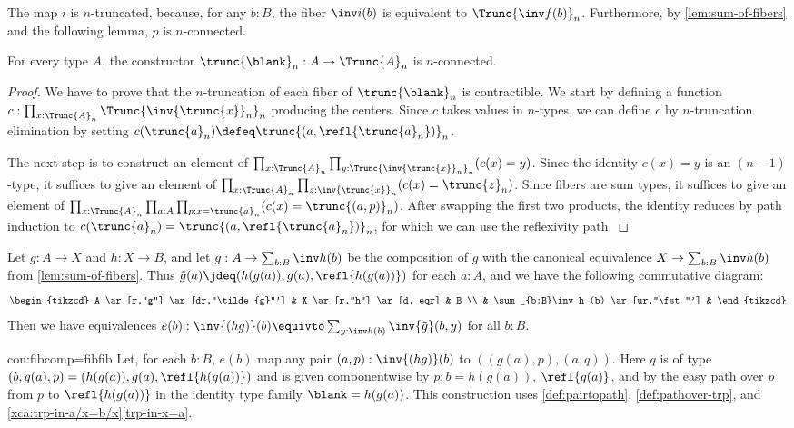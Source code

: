 The map $i$ is $n$-truncated, because, for any $b:B$, the fiber $\inv i (b)$ is equivalent to $\Trunc{\inv f (b)}_n$.
Furthermore, by \cref{lem:sum-of-fibers} and the following lemma, $p$ is $n$-connected.

\begin{lemma}\label{lem:trunc-n-connected}
For every type $A$, the constructor $\trunc{\blank}_n : A\to \Trunc{A}_n$
is $n$-connected.
\end{lemma}
\begin{proof}
We have to prove that the $n$-truncation of each fiber of $\trunc{\blank}_n$
is contractible. We start by defining a function
$c:\prod_{x:\Trunc{A}_n} \Trunc{\inv{\trunc{x}}_n}_n$ producing the centers.
Since $c$ takes values in $n$-types, we can define $c$ by
$n$-truncation elimination by setting
$c(\trunc{a}_n) \defeq \trunc{(a,\refl{\trunc{a}_n})}_n$.

The next step is to construct an element of
$\prod_{x:\Trunc{A}_n} \prod_{y:\Trunc{\inv{\trunc{x}}_n}_n} (c(x)=y)$.
Since the identity $c(x)=y$ is an $(n-1)$-type, it suffices to give an element of
$\prod_{x:\Trunc{A}_n} \prod_{z:\inv{\trunc{x}}_n} (c(x)=\trunc{z}_n)$.
Since fibers are sum types,  it suffices to give an element of
$\prod_{x:\Trunc{A}_n} \prod_{a:A} \prod_{p: x=\trunc{a}_n} (c(x)=\trunc{(a,p)}_n)$.
After swapping the first two products, the identity reduces by path induction
to $c(\trunc{a}_n)=\trunc{(a,\refl{\trunc{a}_n})}_n$, for which we can use
the reflexivity path.
\end{proof}

\begin{construction}\label{con:fibcomp=fibfib}
  Let $g:A\to X$ and $h: X\to B$, and let
$\tilde{g}:A\to \sum_{b:B}\inv h (b)$ be the composition of $g$
with the canonical equivalence $X\to \sum_{b:B}\inv h (b)$ from \cref{lem:sum-of-fibers}.
Thus $\tilde{g}(a)\jdeq (h(g(a)),g(a),\refl{h(g(a))})$ for each $a:A$,
and we have the following commutative diagram:
  \[
    \begin{tikzcd}
      A \ar[r,"g"] \ar[dr,"\tilde{g}"'] & X \ar[r,"h"] \ar[d, eqr] & B \\
      & \sum_{b:B}\inv h (b) \ar[ur,"\fst"'] &
    \end{tikzcd}
  \]
Then we have equivalences $e(b) : \inv {(hg)} (b) \equivto \sum_{y:\inv h (b)} \inv {\tilde{g}}(b,y)$
for all $b:B$.
\end{construction}
\begin{implementation}{con:fibcomp=fibfib}
Let, for each $b:B$, $e(b)$ map any pair $(a,p):\inv {(hg)} (b)$ to
$((g(a),p),(a,q))$. Here $q$ is of type $(b,g(a),p) = (h(g(a)),g(a),\refl{h(g(a))})$
and is given componentwise by $p: b=h(g(a))$, $\refl{g(a)}$, and by the
easy path over $p$ from $p$ to $\refl{h(g(a))}$ in the identity type family $\blank=h(g(a))$.
This construction uses \cref{def:pairtopath}, \cref{def:pathover-trp},
and \cref{xca:trp-in-a/x=b/x}\ref{trp-in-x=a}.
\end{implementation}

